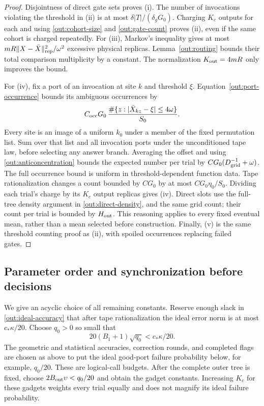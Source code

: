 \begin{proof}
Disjointness of direct gate sets proves (i). The number of invocations
violating the threshold in (ii) is at most
$\delta|T|/(\delta_gG_0)$. Charging $K_c$ outputs for each and using
\eqref{out:cohort-size} and \eqref{out:gate-count} proves (ii), even if
the same cohort is charged repeatedly. For (iii), Markov's inequality
gives at most
$mR\lVert X-\bar X\rVert_{\rm rep}^2/\omega^2$ excessive physical replicas.
Lemma~\ref{out:routing} bounds their total comparison multiplicity by
a constant. The normalization $K_{\rm out}=4mR$ only improves the bound.

For (iv), fix a port of an invocation at site $k$ and threshold $\xi$.
Equation~\eqref{out:port-occurrence} bounds its ambiguous occurrences by
\[
 C_{\rm occ}G_0\,
 \frac{\#\{z:|\bar X_{kz}-\xi|\leq4\omega\}}{S_0}.
\]
Every site is an image of a uniform $k_0$ under a member of the fixed
permutation list. Sum over that list and all invocation ports under the
unconditioned tape law, before selecting any answer branch. Averaging the offset and using
\eqref{out:anticoncentration} bounds the expected number per trial by
$C G_0(D_{\rm grid}^{-1}+\omega)$. The full occurrence bound is uniform
in threshold-dependent function data. Tape rationalization changes a
count bounded by $CG_0$ by at most $CG_0\eta_0/S_0$. Dividing each
trial's charge by its $K_c$ output replicas gives (iv). Direct slots use
the full-tree density argument in \eqref{out:direct-density}, and the
same grid count; their count per trial is bounded by $H_{\rm out}$.
This reasoning applies to every fixed eventual mean, rather than a
mean selected before construction. Finally, (v) is the same threshold
counting proof as (ii), with spoiled occurrences replacing failed gates.
\end{proof}

\subsection{Parameter order and synchronization before decisions}

We give an acyclic choice of all remaining constants. Reserve enough
slack in \eqref{out:ideal-accuracy} that after tape rationalization the
ideal error norm is at most $c_*\kappa/20$. Choose $q_0>0$ so small that
\begin{equation}\label{out:q0}
 20(B_1+1)\sqrt{q_0}<c_*\kappa/20.
\end{equation}
The geometric and statistical accuracies, correction rounds, and
completed flags are chosen as above to put the ideal good-port failure
probability below, for example, $q_0/20$. These are logical-call budgets.
After the complete outer tree is fixed, choose
$2B_{\rm out}\upsilon<q_0/20$ and obtain the gadget constants. Increasing
$K_c$ for these gadgets weights every trial equally and does not
magnify its ideal failure probability.

